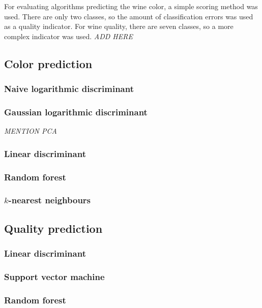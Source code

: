 \documentclass[twoside]{article}
\begin{document}
\begin{multicols}{2}
For evaluating algorithms predicting the wine color, a simple scoring method was used.
There are only two classes, so the amount of classification errors was used as a quality indicator.
For wine quality, there are seven classes, so a more complex indicator was used. \emph{ADD HERE}

\subsection{Color prediction}

\subsubsection{Naive logarithmic discriminant}

\subsubsection{Gaussian logarithmic discriminant}

\emph{MENTION PCA}

\subsubsection{Linear discriminant}

\subsubsection{Random forest}

\subsubsection{$k$-nearest neighbours}

\subsection{Quality prediction}

\subsubsection{Linear discriminant}

\subsubsection{Support vector machine}

\subsubsection{Random forest}


\end{multicols}
\end{document}
